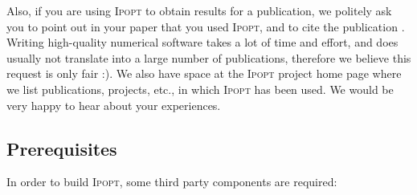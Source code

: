 \documentclass[10pt]{article}
\newcommand{\Ipopt}{\textsc{Ipopt}\xspace}
\begin{document}
Also, if you are using \Ipopt to obtain results for a publication, we
politely ask you to point out in your paper that you used \Ipopt, and
to cite the publication \cite{WaecBieg06:mp}.  Writing high-quality
numerical software takes a lot of time and effort, and does usually
not translate into a large number of publications, therefore we
believe this request is only fair :).  We also have space at the
\Ipopt project home page where we list publications, projects, etc.,
in which \Ipopt has been used.  We would be very happy to hear about
your experiences.

\subsection{Prerequisites}\label{sec:prerequisites}
In order to build \Ipopt, some third party components are required:
\end{document}
